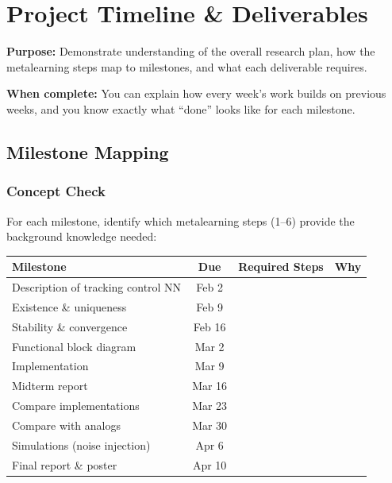 \section{Project Timeline \& Deliverables}

\begin{purposebox}
\textbf{Purpose:} Demonstrate understanding of the overall research plan, how the metalearning steps map to milestones, and what each deliverable requires.

\textbf{When complete:} You can explain how every week's work builds on previous weeks, and you know exactly what ``done'' looks like for each milestone.
\end{purposebox}

\subsection{Milestone Mapping}

\subsubsection*{Concept Check}

For each milestone, identify which metalearning steps (1--6) provide the background knowledge needed:

\medskip
{\small
\begin{tabularx}{\textwidth}{l c X X}
\toprule
\textbf{Milestone} & \textbf{Due} & \textbf{Required Steps} & \textbf{Why} \\
\midrule
Description of tracking control NN   & Feb 2  & & \\[0.6em]
Existence \& uniqueness              & Feb 9  & & \\[0.6em]
Stability \& convergence             & Feb 16 & & \\[0.6em]
Functional block diagram             & Mar 2  & & \\[0.6em]
Implementation                       & Mar 9  & & \\[0.6em]
Midterm report                       & Mar 16 & & \\[0.6em]
Compare implementations              & Mar 23 & & \\[0.6em]
Compare with analogs                 & Mar 30 & & \\[0.6em]
Simulations (noise injection)        & Apr 6  & & \\[0.6em]
Final report \& poster               & Apr 10 & & \\
\bottomrule
\end{tabularx}
}

